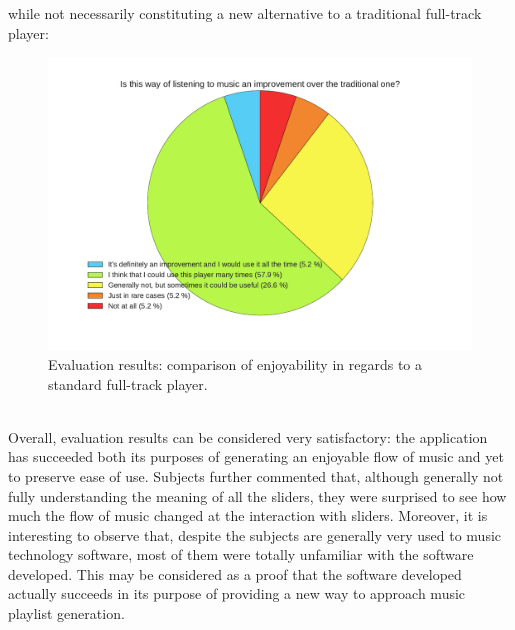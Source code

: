 while not necessarily constituting a new alternative to a traditional full-track player: \\
\begin{figure}[h]
\begin{center}
\includegraphics[scale=0.7]{Figures/improvement.pdf}
  \caption[Evaluation results: comparison of enjoyability in regards to a standard full-track player]{Evaluation results: comparison of enjoyability in regards to a standard full-track player.}
\end{center}
\end{figure}
\\

Overall, evaluation results can be considered very satisfactory: the application has succeeded both its purposes of generating an enjoyable flow of music and yet to preserve ease of use. Subjects further commented that, although generally not fully understanding the meaning of all the sliders, they were surprised to see how much the flow of music changed at the interaction with sliders. Moreover, it is interesting to observe that, despite the subjects are generally very used to music technology software, most of them were totally unfamiliar with the software developed. This may be considered as a proof that the software developed actually succeeds in its purpose of providing a new way to approach music playlist generation.

